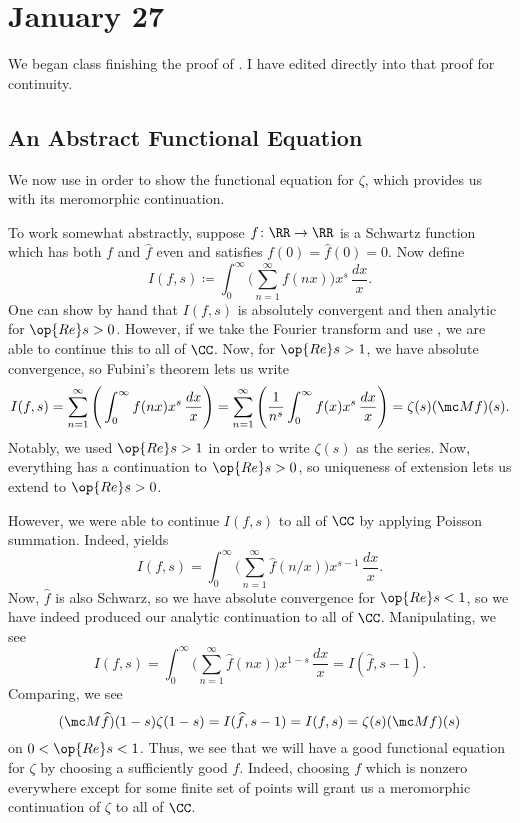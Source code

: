 \documentclass[../notes.tex]{subfiles}
\begin{document}
\section{January 27}

We began class finishing the proof of . I have edited directly into that proof for continuity.

\subsection{An Abstract Functional Equation}
We now use  in order to show the functional equation for $\zeta$, which provides us with its meromorphic continuation.

To work somewhat abstractly, suppose $f\colon\RR\to\RR$ is a Schwartz function which has both $f$ and $\widehat f$ even and satisfies $f(0)=\widehat f(0)=0$. Now define
\[I(f,s)\coloneqq\int_0^\infty\Bigg(\sum_{n=1}^\infty f(nx)\Bigg)x^s\,\frac{dx}x.\]
One can show by hand that $I(f,s)$ is absolutely convergent and then analytic for $\op{Re}s>0$. However, if we take the Fourier transform and use , we are able to continue this to all of $\CC$. Now, for $\op{Re}s>1$, we have absolute convergence, so Fubini's theorem lets us write
\[I(f,s)=\sum_{n=1}^\infty\Bigg(\int_0^\infty f(nx)x^s\,\frac{dx}x\Bigg)=\sum_{n=1}^\infty\Bigg(\frac1{n^s}\int_0^\infty f(x)x^s\,\frac{dx}x\Bigg)=\zeta(s)(\mc Mf)(s).\]
Notably, we used $\op{Re}s>1$ in order to write $\zeta(s)$ as the series. Now, everything has a continuation to $\op{Re}s>0$, so uniqueness of extension lets us extend to $\op{Re}s>0$.

However, we were able to continue $I(f,s)$ to all of $\CC$ by applying Poisson summation. Indeed,  yields
\[I(f,s)=\int_0^\infty\Bigg(\sum_{n=1}^\infty\widehat f(n/x)\Bigg)x^{s-1}\,\frac{dx}x.\]
Now, $\widehat f$ is also Schwarz, so we have absolute convergence for $\op{Re}s<1$, so we have indeed produced our analytic continuation to all of $\CC$. Manipulating, we see
\[I(f,s)=\int_0^\infty\Bigg(\sum_{n=1}^\infty\widehat f(nx)\Bigg)x^{1-s}\,\frac{dx}x=I(\widehat f,s-1).\]
Comparing, we see
\[(\mc M\widehat f)(1-s)\zeta(1-s)=I(\widehat f,s-1)=I(f,s)=\zeta(s)(\mc Mf)(s)\]
on $0<\op{Re}s<1$. Thus, we see that we will have a good functional equation for $\zeta$ by choosing a sufficiently good $f$. Indeed, choosing $f$ which is nonzero everywhere except for some finite set of points will grant us a meromorphic continuation of $\zeta$ to all of $\CC$.
\end{document}
